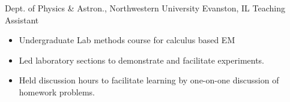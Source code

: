 
        {Dept. of Physics \& Astron., Northwestern University}
        {Evanston, IL}
        {Teaching Assistant}
        {}{
    \begin{itemize}
    	\item Undergraduate Lab methods course for calculus based EM
        \item Led laboratory sections to demonstrate and facilitate experiments. 
        \item Held discussion hours to facilitate learning by one-on-one discussion of homework problems.
    \end{itemize}
}
